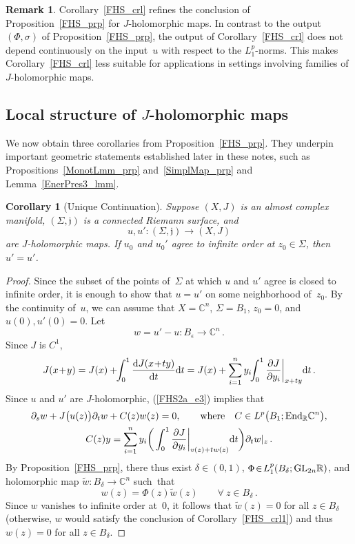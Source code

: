 \documentclass[11pt]{article}
\numberwithin{equation}{section}
\newtheorem{crl}[thm]{Corollary}
\theoremstyle{definition}
\newtheorem{rmk}[thm]{Remark}
\def\BE#1{\begin{equation}\label{#1}}
\def\EE{\end{equation}}
\def\eref#1{(\ref{#1})}
\def\wt#1{\widetilde{#1}}
\def\lra{\longrightarrow}
\def\C{\mathbb{C}}
\def\fj{\mathfrak j}
\def\R{\mathbb R}
\def\de{\delta}
\def\ep{\epsilon}
\def\si{\sigma}
\def\Si{\Sigma}
\def\prt{\partial}
\def\End{\textnormal{End}}
\def\GL{\textnormal{GL}}
\def\nd{\textnormal{d}}
\begin{document}
\begin{rmk}\label{FHS_rmk}
Corollary~\ref{FHS_crl} refines the conclusion of Proposition~\ref{FHS_prp}
for $J$-holomorphic maps.
In contrast to the output $(\Phi,\si)$ of Proposition~\ref{FHS_prp},
the output of Corollary~\ref{FHS_crl} does not depend continuously 
on the input~$u$ with respect to the $L^p_1$-norms.
This makes Corollary~\ref{FHS_crl} less suitable for applications in settings 
involving families of $J$-holomorphic maps.
\end{rmk}







\subsection{Local structure of $J$-holomorphic maps}
\label{LocJMaps_subs2}

\noindent
We now obtain three corollaries from Proposition~\ref{FHS_prp}.
They underpin important geometric statements established later
in these notes, such as Propositions~\ref{MonotLmm_prp} and~\ref{SimplMap_prp}
and Lemma~\ref{EnerPres3_lmm}.

\begin{crl}[Unique Continuation]\label{FHS_crl2a}
Suppose $(X,J)$ is an almost complex manifold, $(\Si,\fj)$ 
is a connected Riemann surface, and
$$u,u'\!:(\Si,\fj)\lra (X,J)$$
are $J$-holomorphic maps.
If $u_0$ and $u_0'$ agree to infinite order at $z_0\!\in\!\Si$, then $u'\!=\!u'$.
\end{crl}

\begin{proof}
Since the subset of the points of~$\Si$ at which $u$ and $u'$ agree is closed to infinite order, 
it is enough to show that $u\!=\!u'$ on some neighborhood of~$z_0$.
By the continuity of~$u$, we can assume that $X\!=\!\C^n$, 
$\Si\!=\!B_1$, $z_0\!=\!0$, and $u(0),u'(0)\!=\!0$.
Let
$$w\!=\!u'\!-\!u:B_{\ep}\lra \C^n\,.$$
Since $J$ is $C^1$,
\BE{FHS2a_e3}J(x\!+\!y)=J(x)+\!\!\int_0^1\frac{\nd J(x\!+\!ty)}{\nd t}\nd t
=J(x)+\sum_{i=1}^ny_i\!\!
\int_0^1\frac{\prt J}{\prt y_i}\bigg|_{x+ty}\nd t\,.\EE
Since $u$ and $u'$ are $J$-holomorphic, \eref{FHS2a_e3} implies that 
\begin{gather*}
\prt_s w + J\big(u(z)\big)\prt_t w+C(z)w(z)=0, \qquad\hbox{where}\quad
C\in L^p\big(B_1;\End_{\R}\C^n\big),\\
C(z)y=\sum_{i=1}^ny_i
\bigg(\int_0^1\frac{\prt J}{\prt y_i}\bigg|_{v(z)+tw(z)}\nd t\bigg)\prt_tw|_z\,.
\end{gather*}
By Proposition~\ref{FHS_prp}, 
there thus exist $\de\!\in\!(0,1)$, \hbox{$\Phi\!\in\!L^p_1(B_{\de};\GL_{2n}\R)$},
and holomorphic map \hbox{$\wt{w}\!:B_{\de}\!\lra\!\C^n$} such~that 
$$w(z)=\Phi(z)\wt{w}(z) \qquad\forall~z\in B_{\de}\,.$$
Since $w$ vanishes to infinite order at~$0$, it follows that
$\wt{w}(z)\!=\!0$ for all $z\!\in\!B_{\de}$
(otherwise, $w$ would satisfy the conclusion of Corollary~\ref{FHS_crl1})
and thus $w(z)\!=\!0$ for all $z\!\in\!B_{\de}$.
\end{proof}
\end{document}
